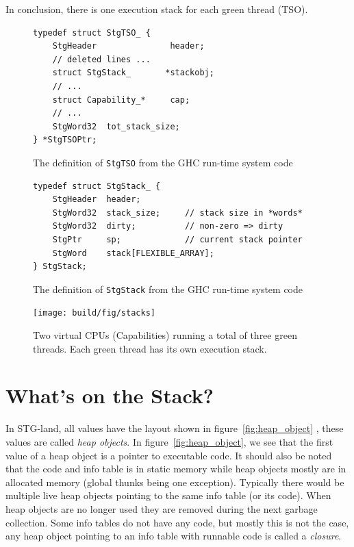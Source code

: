 In conclusion, there is one execution stack for each green thread (TSO).

\begin{figure}
\begin{mdframed}
  \begin{verbatim}
typedef struct StgTSO_ {
    StgHeader               header;
    // deleted lines ...
    struct StgStack_       *stackobj;
    // ...
    struct Capability_*     cap;
    // ...
    StgWord32  tot_stack_size;
} *StgTSOPtr;
  \end{verbatim}
  \caption{The definition of \texttt{StgTSO} from the GHC run-time system
code}
  \label{fig:tso_definition}
\end{mdframed}
\end{figure}

\begin{figure}
\begin{mdframed}
  \begin{verbatim}
typedef struct StgStack_ {
    StgHeader  header;
    StgWord32  stack_size;     // stack size in *words*
    StgWord32  dirty;          // non-zero => dirty
    StgPtr     sp;             // current stack pointer
    StgWord    stack[FLEXIBLE_ARRAY];
} StgStack;
  \end{verbatim}
  \caption{The definition of \texttt{StgStack} from the GHC run-time system
code}
  \label{fig:stack_definition}
\end{mdframed}
\end{figure}

\begin{figure}
\begin{mdframed}
  \centering
  \texttt{[image: build/fig/stacks]}
  \caption{Two virtual CPUs (Capabilities) running a total of three
green threads. Each green thread has its own execution stack.}
  \label{fig:stacks}
\end{mdframed}
\end{figure}

\section{What's on the Stack?} \label{sec:whats_on_the_stack}

In STG-land, all values have the layout shown in figure~\ref{fig:heap_object} \cite{commentary_heap_objects}, these values are
called \emph{heap objects}. In figure~\ref{fig:heap_object}, we see that
the first value of a heap object is a pointer to executable code. It
should also be noted that the code and info table is in static memory
while heap objects mostly are in allocated memory (global thunks being
one exception). Typically there would be multiple live heap objects
pointing to the same info table (or its code). When heap objects are no
longer used they are removed during the next garbage collection. Some
info tables do not have any code, but mostly this is not the case, any
heap object pointing to an info table with runnable code is called a
\emph{closure}.

